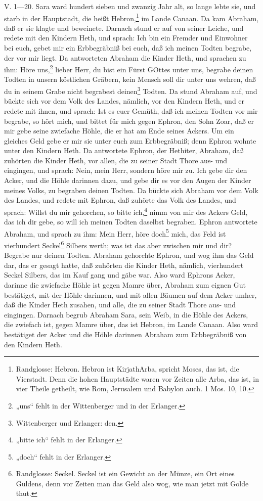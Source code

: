 \begin{schriftzitat}
V. 1—20. Sara ward hundert sieben und zwanzig Jahr alt, so lange lebte sie, und starb in der Hauptstadt, die heißt Hebron,\footnote{Randglosse: Hebron. Hebron ist KirjathArba, spricht Moses, das ist, die Vierstadt. Denn die hohen Hauptstädte waren vor Zeiten alle Arba, das ist, in vier Theile getheilt, wie Rom, Jerusalem und Babylon auch. 1 Mos. 10, 10.} im Lande Canaan. Da kam Abraham, daß er sie klagte und beweinete. Darnach stund er auf von seiner Leiche, und redete mit den Kindern Heth, und sprach: Ich bin ein Fremder und Einwohner bei euch, gebet mir ein Erbbegräbniß bei euch, daß ich meinen Todten begrabe, der vor mir liegt. Da antworteten Abraham die Kinder Heth, und sprachen zu ihm: Höre uns,\footnote{„uns“ fehlt in der Wittenberger und in der Erlanger.} lieber Herr, du bist ein Fürst GOttes unter uns, begrabe deinen Todten in unsern köstlichen Gräbern, kein Mensch soll dir unter uns wehren, daß du in seinem Grabe nicht begrabest deinen\footnote{Wittenberger und Erlanger: den.} Todten. Da stund Abraham auf, und bückte sich vor dem Volk des Landes, nämlich, vor den Kindern Heth, und er redete mit ihnen, und sprach: Ist es euer Gemüth, daß ich meinen Todten vor mir begrabe, so hört mich, und bittet für mich gegen Ephron, den Sohn Zoar, daß er mir gebe seine zwiefache Höhle, die er hat am Ende seines Ackers. Um ein gleiches Geld gebe er mir sie unter euch zum Erbbegräbniß; denn Ephron wohnte unter den Kindern Heth. Da antwortete Ephron, der Hethiter, Abraham, daß zuhörten die Kinder Heth, vor allen, die zu seiner Stadt Thore aus- und eingingen, und sprach: Nein, mein Herr, sondern höre mir zu. Ich gebe dir den Acker, und die Höhle darinnen dazu, und gebe dir es vor den Augen der Kinder meines Volks, zu begraben deinen Todten. Da bückte sich Abraham vor dem Volk des Landes, und redete mit Ephron, daß zuhörte das Volk des Landes, und sprach: Willst du mir gehorchen, so bitte ich,\footnote{„bitte ich“ fehlt in der Erlanger.} nimm von mir des Ackers Geld, das ich dir gebe, so will ich meinen Todten daselbst begraben. Ephron antwortete Abraham, und sprach zu ihm: Mein Herr, höre doch\footnote{„doch“ fehlt in der Erlanger.} mich, das Feld ist vierhundert Seckel\footnote{Randglosse: Seckel. Seckel ist ein Gewicht an der Münze, ein Ort eines Guldens, denn vor Zeiten man das Geld also wog, wie man jetzt mit Golde thut.} Silbers werth; was ist das aber zwischen mir und dir? Begrabe nur deinen Todten. Abraham gehorchte Ephron, und wog ihm das Geld dar, das er gesagt hatte, daß zuhörten die Kinder Heth, nämlich, vierhundert Seckel Silbers, das im Kauf gang und gäbe war. Also ward Ephrons Acker, darinne die zwiefache Höhle ist gegen Mamre über, Abraham zum eignen Gut bestätiget, mit der Höhle darinnen, und mit allen Bäumen auf dem Acker umher, daß die Kinder Heth zusahen, und alle, die zu seiner Stadt Thore aus- und eingingen. Darnach begrub Abraham Sara, sein Weib, in die Höhle des Ackers, die zwiefach ist, gegen Mamre über, das ist Hebron, im Lande Canaan. Also ward bestätiget der Acker und die Höhle darinnen Abraham zum Erbbegräbniß von den Kindern Heth.
\end{schriftzitat}

